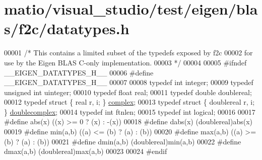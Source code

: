 \hypertarget{matio_2visual__studio_2test_2eigen_2blas_2f2c_2datatypes_8h_source}{}\section{matio/visual\+\_\+studio/test/eigen/blas/f2c/datatypes.h}
\label{matio_2visual__studio_2test_2eigen_2blas_2f2c_2datatypes_8h_source}

\begin{DoxyCode}
00001 \textcolor{comment}{/* This contains a limited subset of the typedefs exposed by f2c}
00002 \textcolor{comment}{   for use by the Eigen BLAS C-only implementation.}
00003 \textcolor{comment}{*/}
00004 
00005 \textcolor{preprocessor}{#ifndef \_\_EIGEN\_DATATYPES\_H\_\_}
00006 \textcolor{preprocessor}{#define \_\_EIGEN\_DATATYPES\_H\_\_}
00007 
00008 \textcolor{keyword}{typedef} \textcolor{keywordtype}{int} integer;
00009 \textcolor{keyword}{typedef} \textcolor{keywordtype}{unsigned} \textcolor{keywordtype}{int} uinteger;
00010 \textcolor{keyword}{typedef} \textcolor{keywordtype}{float} real;
00011 \textcolor{keyword}{typedef} \textcolor{keywordtype}{double} doublereal;
00012 \textcolor{keyword}{typedef} \textcolor{keyword}{struct }\{ real r, i; \} \hyperlink{structcomplex}{complex};
00013 \textcolor{keyword}{typedef} \textcolor{keyword}{struct }\{ doublereal r, i; \} \hyperlink{structdoublecomplex}{doublecomplex};
00014 \textcolor{keyword}{typedef} \textcolor{keywordtype}{int} ftnlen;
00015 \textcolor{keyword}{typedef} \textcolor{keywordtype}{int} logical;
00016 
00017 \textcolor{preprocessor}{#define abs(x) ((x) >= 0 ? (x) : -(x))}
00018 \textcolor{preprocessor}{#define dabs(x) (doublereal)abs(x)}
00019 \textcolor{preprocessor}{#define min(a,b) ((a) <= (b) ? (a) : (b))}
00020 \textcolor{preprocessor}{#define max(a,b) ((a) >= (b) ? (a) : (b))}
00021 \textcolor{preprocessor}{#define dmin(a,b) (doublereal)min(a,b)}
00022 \textcolor{preprocessor}{#define dmax(a,b) (doublereal)max(a,b)}
00023 
00024 \textcolor{preprocessor}{#endif}
\end{DoxyCode}
